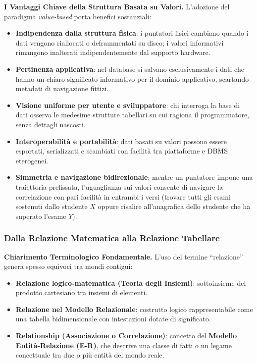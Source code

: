 \documentclass[12pt]{extarticle}
\begin{document}
\medskip
\noindent \textbf{I Vantaggi Chiave della Struttura Basata su Valori.} L'adozione del paradigma \textit{value-based} porta benefici sostanziali:
\begin{itemize}
    \item \textbf{Indipendenza dalla struttura fisica}: i puntatori fisici cambiano quando i dati vengono riallocati o deframmentati su disco; i valori informativi rimangono inalterati indipendentemente dal supporto hardware.
    \item \textbf{Pertinenza applicativa}: nel database si salvano esclusivamente i dati che hanno un chiaro significato informativo per il dominio applicativo, scartando metadati di navigazione fittizi.
    \item \textbf{Visione uniforme per utente e sviluppatore}: chi interroga la base di dati osserva le medesime strutture tabellari su cui ragiona il programmatore, senza dettagli nascosti.
    \item \textbf{Interoperabilità e portabilità}: dati basati su valori possono essere esportati, serializzati e scambiati con facilità tra piattaforme e DBMS eterogenei.
    \item \textbf{Simmetria e navigazione bidirezionale}: mentre un puntatore impone una traiettoria prefissata, l'uguaglianza sui valori consente di navigare la correlazione con pari facilità in entrambi i versi (trovare tutti gli esami sostenuti dallo studente $X$ oppure risalire all'anagrafica dello studente che ha superato l'esame $Y$).
\end{itemize}

\subsubsection{Dalla Relazione Matematica alla Relazione Tabellare}
\noindent \textbf{Chiarimento Terminologico Fondamentale.} L'uso del termine ``relazione'' genera spesso equivoci tra mondi contigui:
\begin{itemize}
    \item \textbf{Relazione logico-matematica (Teoria degli Insiemi)}: sottoinsieme del prodotto cartesiano tra insiemi di elementi.
    \item \textbf{Relazione nel Modello Relazionale}: costrutto logico rappresentabile come una tabella bidimensionale con intestazioni dotate di significato.
    \item \textbf{Relationship (Associazione o Correlazione)}: concetto del \textbf{Modello Entità-Relazione (E-R)}, che descrive una classe di fatti o un legame concettuale tra due o più entità del mondo reale.
\end{itemize}
\end{document}
